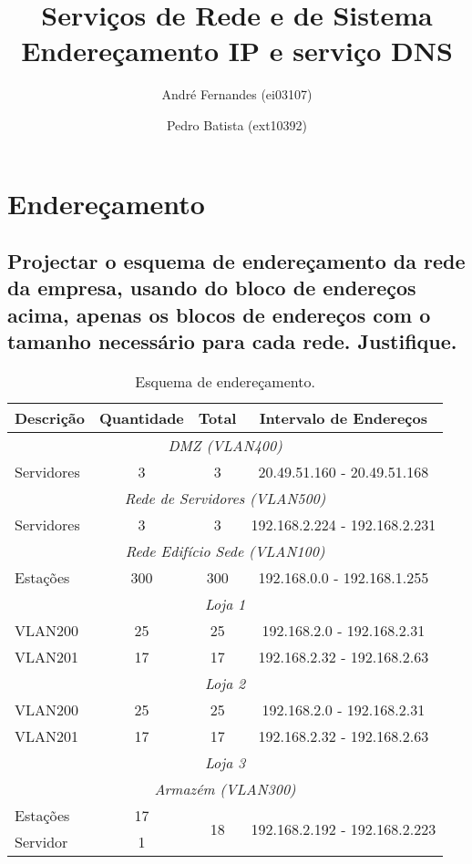\documentclass[a4paper,12pt]{article}
\title{Serviços de Rede e de Sistema \\
Endereçamento IP e serviço DNS}
\author{André Fernandes (ei03107) \and Pedro Batista (ext10392)}
\begin{document}
\maketitle

\section{Endereçamento}
\subsection{Projectar o esquema de endereçamento da rede da empresa,
usando do bloco de endereços acima, apenas os blocos de endereços com
o tamanho necessário para cada rede. Justifique.}

\begin{table}[h]
   \centering
   \begin{tabular}{ l | c | c | c }
      \toprule
      \textbf{Descrição} & \textbf{Quantidade} & \textbf{Total} & \textbf{Intervalo de Endereços} \\\hline

      \multicolumn{4}{c}{\textit{DMZ (VLAN400)}} \\\hline
      Servidores & 3 & 3 & 20.49.51.160 - 20.49.51.168 \\\hline

      \multicolumn{4}{c}{\textit{Rede de Servidores (VLAN500)}} \\\hline
      Servidores & 3 & 3 & 192.168.2.224 - 192.168.2.231 \\\hline

      \multicolumn{4}{c}{\textit{Rede Edifício Sede (VLAN100)}} \\ \hline
      Estações & 300 & 300 & 192.168.0.0 - 192.168.1.255 \\ \hline

      \multicolumn{4}{c}{\textit{Loja 1 }} \\\hline
      VLAN200 & 25 & 25 & 192.168.2.0 - 192.168.2.31 \\\hline
      VLAN201 & 17 & 17 & 192.168.2.32 - 192.168.2.63 \\\hline
      \multicolumn{4}{c}{\textit{Loja 2}} \\\hline
       VLAN200 & 25 & 25 & 192.168.2.0 - 192.168.2.31 \\\hline
      VLAN201 & 17 & 17 & 192.168.2.32 - 192.168.2.63 \\\hline
      
      \multicolumn{4}{c}{\textit{Loja 3}} \\\hline

      \multicolumn{4}{c}{\textit{Armazém (VLAN300)}} \\\hline
      Estações & 17 & \multirow{2}{*}{18} & \multirow{2}{*}{192.168.2.192 - 192.168.2.223} \\\cline{1-2}
      Servidor & 1 & \\ \bottomrule

   \end{tabular}
   \caption{Esquema de endereçamento.}
   \label{tab:enderecamento_esquema}
\end{table}
\end{document}
